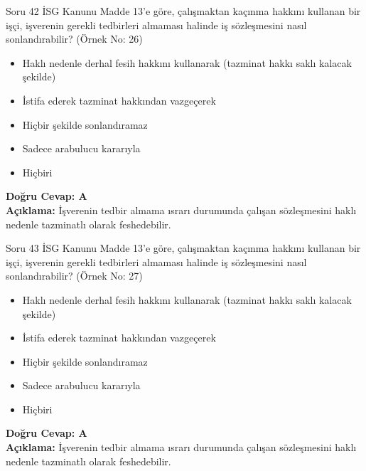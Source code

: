\documentclass[12pt,a4paper]{article}
\begin{document}
\begin{testcard}{Soru 42}
    İSG Kanunu Madde 13'e göre, çalışmaktan kaçınma hakkını kullanan bir işçi, işverenin gerekli tedbirleri almaması halinde iş sözleşmesini nasıl sonlandırabilir? (Örnek No: 26)
    \begin{itemize}
        \item[A)] Haklı nedenle derhal fesih hakkını kullanarak (tazminat hakkı saklı kalacak şekilde)
        \item[B)] İstifa ederek tazminat hakkından vazgeçerek
        \item[C)] Hiçbir şekilde sonlandıramaz
        \item[D)] Sadece arabulucu kararıyla
        \item[E)] Hiçbiri
    \end{itemize}
    \tcblower
    \textbf{Doğru Cevap: A} \\
    \textbf{Açıklama:} İşverenin tedbir almama ısrarı durumunda çalışan sözleşmesini haklı nedenle tazminatlı olarak feshedebilir.
\end{testcard}

\begin{testcard}{Soru 43}
    İSG Kanunu Madde 13'e göre, çalışmaktan kaçınma hakkını kullanan bir işçi, işverenin gerekli tedbirleri almaması halinde iş sözleşmesini nasıl sonlandırabilir? (Örnek No: 27)
    \begin{itemize}
        \item[A)] Haklı nedenle derhal fesih hakkını kullanarak (tazminat hakkı saklı kalacak şekilde)
        \item[B)] İstifa ederek tazminat hakkından vazgeçerek
        \item[C)] Hiçbir şekilde sonlandıramaz
        \item[D)] Sadece arabulucu kararıyla
        \item[E)] Hiçbiri
    \end{itemize}
    \tcblower
    \textbf{Doğru Cevap: A} \\
    \textbf{Açıklama:} İşverenin tedbir almama ısrarı durumunda çalışan sözleşmesini haklı nedenle tazminatlı olarak feshedebilir.
\end{testcard}
\end{document}
